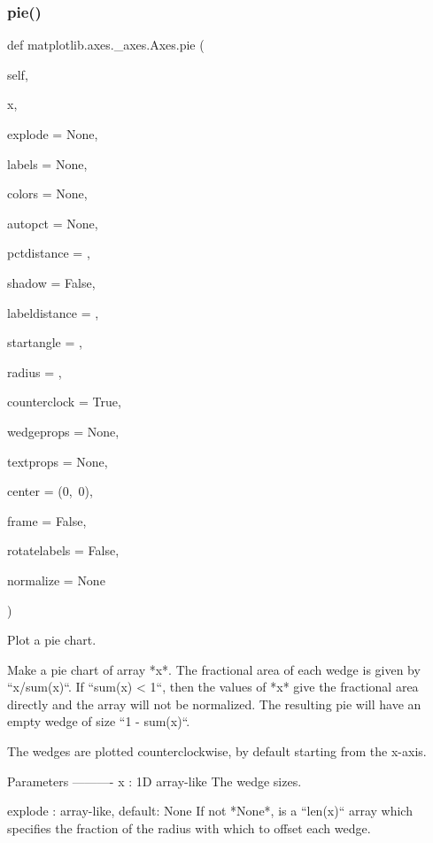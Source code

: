 \begin{DoxyVerb}
\subsubsection{\texorpdfstring{pie()}{pie()}}
{\footnotesize\ttfamily def matplotlib.\+axes.\+\_\+axes.\+Axes.\+pie (\begin{DoxyParamCaption}\item[{}]{self,  }\item[{}]{x,  }\item[{}]{explode = {\ttfamily None},  }\item[{}]{labels = {\ttfamily None},  }\item[{}]{colors = {\ttfamily None},  }\item[{}]{autopct = {\ttfamily None},  }\item[{}]{pctdistance = {},  }\item[{}]{shadow = {\ttfamily False},  }\item[{}]{labeldistance = {},  }\item[{}]{startangle = {},  }\item[{}]{radius = {},  }\item[{}]{counterclock = {\ttfamily True},  }\item[{}]{wedgeprops = {\ttfamily None},  }\item[{}]{textprops = {\ttfamily None},  }\item[{}]{center = {\ttfamily (0,~0)},  }\item[{}]{frame = {\ttfamily False},  }\item[{}]{rotatelabels = {\ttfamily False},  }\item[{}]{normalize = {\ttfamily None} }\end{DoxyParamCaption})}

\begin{DoxyVerb}Plot a pie chart.

Make a pie chart of array *x*.  The fractional area of each wedge is
given by ``x/sum(x)``.  If ``sum(x) < 1``, then the values of *x* give
the fractional area directly and the array will not be normalized. The
resulting pie will have an empty wedge of size ``1 - sum(x)``.

The wedges are plotted counterclockwise, by default starting from the
x-axis.

Parameters
----------
x : 1D array-like
    The wedge sizes.

explode : array-like, default: None
    If not *None*, is a ``len(x)`` array which specifies the fraction
    of the radius with which to offset each wedge.


\end{DoxyVerb}
\end{DoxyVerb}
